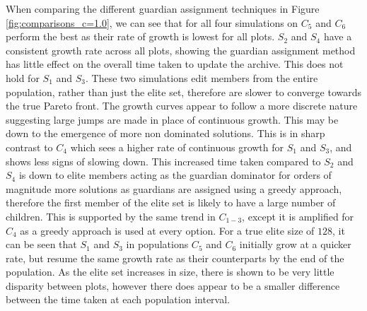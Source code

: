 \documentclass{ecmm427_assignment}
\begin{document}
When comparing the different guardian assignment techniques in Figure \ref{fig:comparisons_c=1.0}, we can see that for all four simulations on $C_5$ and $C_6$ perform the best as their rate of growth is lowest for all plots. $S_2$ and $S_4$ have a consistent growth rate across all plots, showing the guardian assignment method has little effect on the overall time taken to update the archive. This does not hold for $S_1$ and $S_3$. These two simulations edit members from the entire population, rather than just the elite set, therefore are slower to converge towards the true Pareto front. The growth curves appear to follow a more discrete nature suggesting large jumps are made in place of continuous growth. This may be down to the emergence of more non dominated solutions. This is in sharp contrast to $C_4$ which sees a higher rate of continuous growth for $S_1$ and $S_3$, and shows less signs of slowing down. This increased time taken compared to $S_2$ and $S_4$ is down to elite members acting as the guardian dominator for orders of magnitude more solutions as guardians are assigned using a greedy approach, therefore the first member of the elite set is likely to have a large number of children. This is supported by the same trend in $C_{1-3}$, except it is amplified for $C_4$ as a greedy approach is used at every option. For a true elite size of $128$, it can be seen that $S_1$ and $S_3$ in populations $C_5$ and $C_6$ initially grow at a quicker rate, but resume the same growth rate as their counterparts by the end of the population. As the elite set increases in size, there is shown to be very little disparity between plots, however there does appear to be a smaller difference between the time taken at each population interval.
\end{document}
